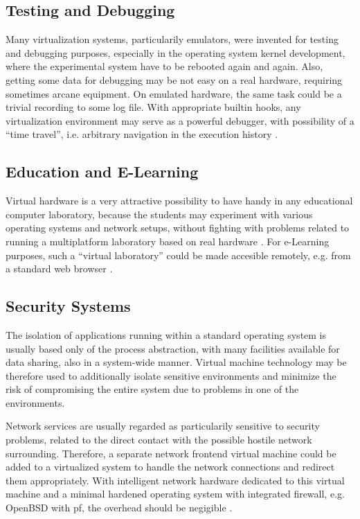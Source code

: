 \documentclass[11pt,a4paper]{llncs}
\begin{document}
\subsection{Testing and Debugging}


Many virtualization systems, particularily emulators, were invented for
testing and debugging purposes, especially in the operating system kernel 
development, where the experimental system have to be rebooted again and
again. 
Also, getting some data for debugging may be not easy on a real hardware,
requiring sometimes arcane equipment. On emulated hardware, the same task
could be a trivial recording to some log file. With appropriate builtin
hooks, any virtualization environment may serve as a powerful debugger,
with possibility of a ``time travel'', i.e. arbitrary navigation in the 
execution history \cite{King05_1}.



\subsection{Education and E-Learning}


Virtual hardware is a very attractive possibility to have handy in any 
educational computer laboratory, because the students may experiment
with various operating systems and network setups, without fighting with 
problems related to running a multiplatform laboratory based on real hardware
\cite{SIGSE38_102}. 
For e-Learning purposes, such a ``virtual laboratory'' could be made
accesible remotely, e.g. from a standard web browser \cite{FOSLET06damiani}.



\subsection{Security Systems}


The isolation of applications running within a standard operating system is 
usually based only of the process abstraction, with many facilities available
for data sharing, also in a system-wide manner. 
Virtual machine technology may be therefore used to additionally isolate 
sensitive environments and minimize the risk of compromising the entire 
system due to problems in one of the environments. 


Network services are usually regarded as particularily sensitive to security
problems, related to the direct contact with the possible hostile network
surrounding. 
Therefore, a separate network frontend virtual machine could be added to a 
virtualized system to handle the network connections and redirect them 
appropriately. With intelligent network hardware dedicated to this virtual 
machine and a minimal hardened operating system with integrated firewall, 
e.g. OpenBSD with pf, the overhead should be negigible \cite{Prevelakis}.
\end{document}
